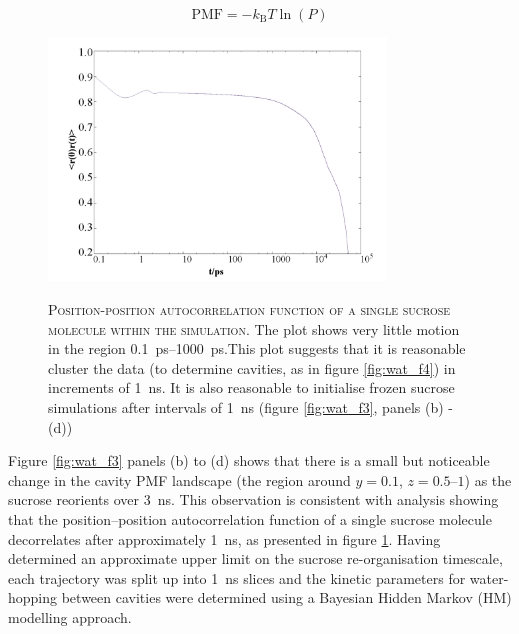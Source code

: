 \begin{equation}\label{eqn:pmf}
\mathrm{PMF}=-k_{\mathrm{B}} T \ln (P)
\end{equation}

\begin{figure}
    \centering
    \caption[Position-position autocorrelation function of a single sucrose molecule within the simulation]{\textsc{Position-position autocorrelation function of a single sucrose molecule within the simulation}. The plot shows very little motion in the region \SIrange{0.1}{1000}{\pico\second}.This plot suggests that it is reasonable cluster the data (to determine cavities, as in figure \ref{fig:wat_f4}) in increments of \SI{1}{\nano\second}. It is also reasonable to initialise frozen sucrose simulations after intervals of \SI{1}{\nano\second} (figure \ref{fig:wat_f3}, panels (b) - (d))}
    \includegraphics[width=0.8\textwidth]{chapters/water_hopping/figures/Fig_S8.png}
    \label{fig:wat_s8}
\end{figure}

Figure \ref{fig:wat_f3} panels (b) to (d) shows that there is a small but noticeable change in the cavity PMF landscape (the region around $y = 0.1$, $z = \numrange[range-phrase=--]{0.5}{1}$) as the sucrose reorients over \SI{3}{\nano\second}. This observation is consistent with analysis showing that the position–position autocorrelation function of a single sucrose molecule decorrelates after approximately \SI{1}{\nano\second}, as presented in figure \ref{fig:wat_s8}. Having determined an approximate upper limit on the sucrose re-organisation timescale,  each trajectory was split up into \SI{1}{\nano\second} slices and  the kinetic parameters for water-hopping between cavities were determined using a Bayesian Hidden Markov (HM) modelling approach. 

